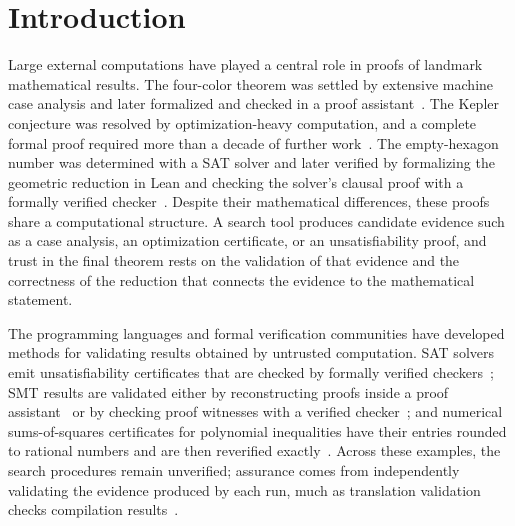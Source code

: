 \documentclass[acmsmall,screen=true,acmthm=false]{acmart}
\begin{document}

\maketitle

\section{Introduction}
\label{sec:intro}

Large external computations have played a central role in proofs of landmark
mathematical results.  The four-color theorem was settled by extensive machine
case analysis and later formalized and checked in a proof
assistant~\cite{gonthier2008fourcolour}.  The Kepler conjecture was resolved by
optimization-heavy computation, and a complete formal proof required more than
a decade of further work~\cite{hales2017kepler}.  The empty-hexagon number was
determined with a SAT solver and later verified by formalizing the geometric
reduction in Lean and checking the solver's clausal proof with a formally
verified checker~\cite{heule2024hexagon,subercaseaux2024hexagon}.  Despite their
mathematical differences, these proofs share a computational structure.  A
search tool produces candidate evidence such as a case analysis, an optimization
certificate, or an unsatisfiability proof, and trust in the final theorem rests
on the validation of that evidence and the correctness of the reduction
that connects the evidence to the mathematical statement.

The programming languages and formal verification communities have developed
methods for validating results obtained by untrusted computation.  SAT solvers
emit unsatisfiability certificates that are checked by formally verified
checkers~\cite{lammich2020unsat,tan2023cakelpr}; SMT results are validated either
by reconstructing proofs inside a proof assistant~\cite{bohme2010z3} or by
checking proof witnesses with a verified checker~\cite{armand2011modular}; and
numerical sums-of-squares certificates for polynomial inequalities have their
entries rounded to rational numbers and are then reverified
exactly~\cite{harrison2007verifying,besson2006fast,morrison2026sos}.
Across these examples, the search procedures remain unverified; assurance comes
from independently validating the evidence produced by each run, much as
translation validation checks compilation
results~\cite{pnueli1998translation}.
\end{document}
